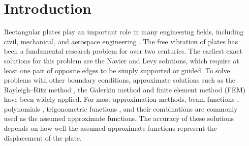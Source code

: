 \documentclass[preprint,12pt,number]{elsarticle}
\begin{document}
\section{Introduction}
Rectangular plates play an important role in many engineering fields, including civil, mechanical, and aerospace engineering \citep{biancolini2005approximate}. 
The free vibration of plates has been a fundamental research problem for over two centuries. 
The earliest exact solutions for this problem are the Navier \citep{navier1823extrait} and Levy \citep{levy1899equilibre} solutions, which require at least one pair of opposite edges to be simply supported or guided.
To solve problems with other boundary conditions, approximate solutions such as the Rayleigh–Ritz method \cite{leissa1973free,lam1989vibration,zhao2025free,jain2024bending,bagheri2024analysis}, the Galerkin method \cite{laura1967study,krysl1995analysis,ma2024analysis,ma2024error,pereira2025modified} and finite element method (FEM) \cite{zhao2024fast,yang2022analysis,paccola2016continuous,carrera2024finite,yang2025semi} have been widely applied. 
For most approximation methods, beam functions \cite{ding1996natural,cheung1999free,cheung1999free2,zhou2002vibrations}, polynomials \cite{bhat1985natural,xie2025efficient,celep2025elastic,madinier2025spatial,sun2023spectral}, trigonometric functions \cite{filipich2000arbitrary,kumar2004buckling,yessenbayeva2019calculation,he2021study,su2022vibration}, and their combinations \cite{li2004vibration,cheung2000vibrations,zhou2001vibrations,monterrubio2015proof,onyeka2022application} are commonly used as the assumed approximate functions.
The accuracy of these solutions depends on how well the assumed approximate functions represent the displacement of the plate.
\end{document}
